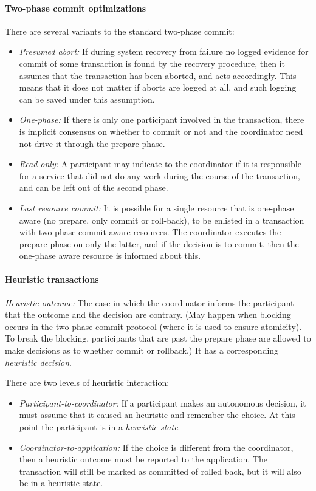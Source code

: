 \paragraph{Two-phase commit optimizations} There are several variants to the standard two-phase commit:
\begin{itemize}[nolistsep,noitemsep]
  \item \textit{Presumed abort:} If during system recovery from failure no logged evidence for commit of some transaction is found by the recovery procedure, then it assumes that the transaction has been aborted, and acts accordingly. This means that it does not matter if aborts are logged at all, and such logging can be saved under this assumption.
  \item \textit{One-phase:} If there is only one participant involved in the transaction, there is implicit consensus on whether to commit or not and the coordinator need not drive it through the prepare phase.
  \item \textit{Read-only:}  A participant may indicate to the coordinator if it is responsible for a service that did not do any work during the course of the transaction, and can be left out of the second phase.
  \item \textit{Last resource commit:} It is possible for a single resource that is one-phase aware (no prepare, only commit or roll-back), to be enlisted in a transaction with two-phase commit aware resources. The coordinator executes the prepare phase on only the latter, and if the decision is to commit, then the one-phase aware resource is informed about this.
\end{itemize}

\paragraph{Heuristic transactions}

\textit{Heuristic outcome:} The case in which the coordinator informs the participant that the outcome and the decision are contrary. (May happen when blocking occurs in the two-phase commit protocol (where it is used to ensure atomicity). To break the blocking, participants that are past the prepare phase are allowed to make decisions as to whether commit or rollback.) It has a corresponding \textit{heuristic decision}.

There are two levels of heuristic interaction:
\begin{itemize}
  \item \textit{Participant-to-coordinator:} If a participant makes an autonomous decision, it must assume that it caused an heuristic and remember the choice. At this point the participant is in a \textit{heuristic state}.
  \item \textit{Coordinator-to-application:} If the choice is different from the coordinator, then a heuristic outcome must be reported to the application. The transaction will still be marked as committed of rolled back, but it will also be in a heuristic state.
\end{itemize}

